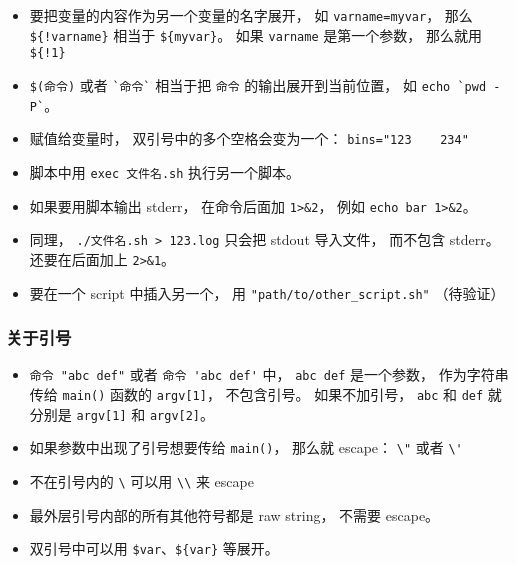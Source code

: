 \begin{itemize}
\item 要把变量的内容作为另一个变量的名字展开， 如 \verb|varname=myvar|， 那么 \verb|${!varname}| 相当于 \verb|${myvar}|。 如果 \verb|varname| 是第一个参数， 那么就用 \verb|${!1}|
\item \verb|$(命令)| 或者 \verb|`命令`| 相当于把 \verb|命令| 的输出展开到当前位置， 如 \verb|echo `pwd -P`|。
\item 赋值给变量时， 双引号中的多个空格会变为一个： \verb|bins="123    234"|
\item 脚本中用 \verb|exec 文件名.sh| 执行另一个脚本。
\item 如果要用脚本输出 stderr， 在命令后面加 \verb|1>&2|， 例如 \verb|echo bar 1>&2|。
\item 同理， \verb|./文件名.sh > 123.log| 只会把 stdout 导入文件， 而不包含 stderr。 还要在后面加上 \verb|2>&1|。
\item 要在一个 script 中插入另一个， 用 \verb|"path/to/other_script.sh"| （待验证）
\end{itemize}

\subsubsection{关于引号}
\begin{itemize}
\item \verb|命令 "abc def"| 或者 \verb|命令 'abc def'| 中， \verb|abc def| 是一个参数， 作为字符串传给 \verb|main()| 函数的 \verb|argv[1]|， 不包含引号。 如果不加引号， \verb|abc| 和 \verb|def| 就分别是 \verb|argv[1]| 和 \verb|argv[2]|。
\item 如果参数中出现了引号想要传给 \verb|main()|， 那么就 escape： \verb|\"| 或者 \verb|\'|
\item 不在引号内的 \verb|\| 可以用 \verb|\\| 来 escape
\item 最外层引号内部的所有其他符号都是 raw string， 不需要 escape。
\item 双引号中可以用 \verb|$var|、\verb|${var}| 等展开。
\end{itemize}


